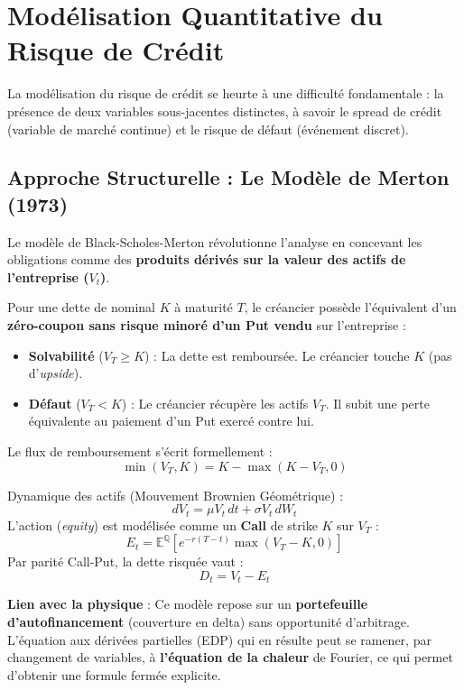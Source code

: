 \section{Modélisation Quantitative du Risque de Crédit}

La modélisation du risque de crédit se heurte à une difficulté fondamentale : la présence de deux variables sous-jacentes distinctes, à savoir le spread de crédit (variable de marché continue) et le risque de défaut (événement discret).

\subsection{Approche Structurelle : Le Modèle de Merton (1973)}
\label{sec:merton}

Le modèle de Black-Scholes-Merton révolutionne l'analyse en concevant les obligations comme des \textbf{produits dérivés sur la valeur des actifs de l'entreprise ($V_t$)}. 

Pour une dette de nominal $K$ à maturité $T$, le créancier possède l'équivalent d'un \textbf{zéro-coupon sans risque minoré d'un Put vendu} sur l'entreprise :
\begin{itemize}
    \item \textbf{Solvabilité} ($V_T \geq K$) : La dette est remboursée. Le créancier touche $K$ (pas d'\textit{upside}).
    \item \textbf{Défaut} ($V_T < K$) : Le créancier récupère les actifs $V_T$. Il subit une perte équivalente au paiement d'un Put exercé contre lui.
\end{itemize}

Le flux de remboursement s'écrit formellement :
\begin{equation}
    \min(V_T, K) = K - \max(K - V_T, 0)
\end{equation}

\begin{definition}
Dynamique des actifs (Mouvement Brownien Géométrique) : 
\[ dV_t = \mu V_t \, dt + \sigma V_t \, dW_t \]
L'action (\textit{equity}) est modélisée comme un \textbf{Call} de strike $K$ sur $V_T$ : 
\[ E_t = \mathbb{E}^{\mathbb{Q}}\!\left[e^{-r(T-t)} \max(V_T - K, 0)\right] \]
Par parité Call-Put, la dette risquée vaut : 
\[ D_t = V_t - E_t \]
\end{definition}

\textbf{Lien avec la physique} : Ce modèle repose sur un \textbf{portefeuille d'autofinancement} (couverture en delta) sans opportunité d'arbitrage. L'équation aux dérivées partielles (EDP) qui en résulte peut se ramener, par changement de variables, à \textbf{l'équation de la chaleur} de Fourier, ce qui permet d'obtenir une formule fermée explicite.

